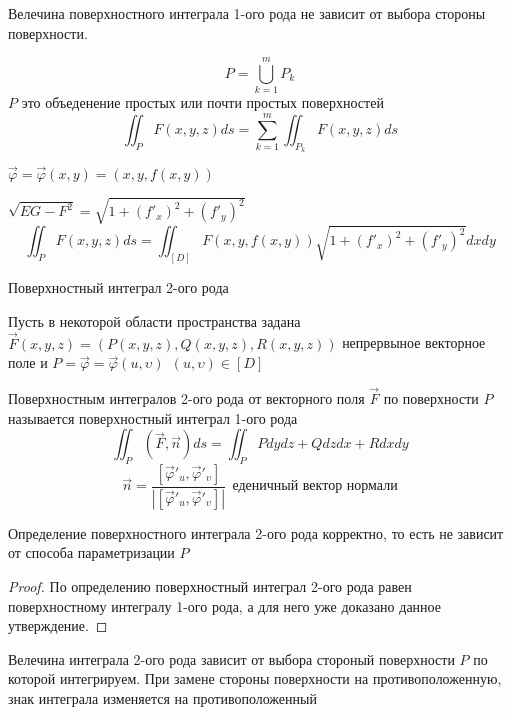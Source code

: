 \begin{theorem}
  Велечина поверхностного интеграла 1-ого рода не зависит от выбора стороны
  поверхности.
\end{theorem}

\begin{theorem}
  $$
  P = \bigcup_{k=1}^m P_k
  $$
  $P$ это объеденение простых или почти простых поверхностей
  $$
  \iint_P F(x,y,z) ds = \sum_{k=1}^m \iint_{P_k} F(x,y,z) ds
  $$
\end{theorem}

\begin{theorem}
  $\vec \varphi = \vec \varphi(x, y) = (x, y, f(x,y))$

  $\sqrt{EG-F^2} = \sqrt{1 + (f'_x)^2 + (f'_y)^2}$
  $$
  \iint_P F(x,y,z)ds = \iint_{[D]} F(x,y,f(x,y)) \sqrt{1 + (f'_x)^2 + (f'_y)^2}
  dx dy
  $$
\end{theorem}

\begin{title}[\Large]
  Поверхностный интеграл 2-ого рода
\end{title}

\begin{define}
  Пусть в некоторой области пространства задана
  $\vec F(x,y,z) = (P(x,y,z), Q(x,y,z),R(x,y,z))$ непрервыное векторное поле и
  $P = \vec \varphi = \vec \varphi(u, \upsilon) ~~ (u, \upsilon) \in [D]$

  Поверхностным интегралов 2-ого рода от векторного поля $\vec F$ по поверхности
  $P$ называется поверхностный интеграл 1-ого рода
  $$
  \iint_P (\vec F, \vec n) ds = \iint_P P dy dz + Q dz dx + Rdx dy
  $$
  $$
  \vec n = \frac{[\vec \varphi'_u, \vec \varphi'_{\upsilon}]}
  {|[\vec \varphi'_u, \vec \varphi'_{\upsilon}]|} ~~
  \text{еденичный вектор нормали}
  $$
\end{define}

\begin{theorem}
  Определение поверхностного интеграла 2-ого рода корректно, то есть не зависит
  от способа параметризации $P$
\end{theorem}

\begin{proof}
  По определению поверхностный интеграл 2-ого рода равен поверхностному
  интегралу 1-ого рода, а для него уже доказано данное утверждение.
\end{proof}

\begin{theorem}
  Велечина интеграла 2-ого рода зависит от выбора стороный поверхности $P$ по
  которой интегрируем. При замене стороны поверхности на противоположенную,
  знак интеграла изменяется на противоположенный
\end{theorem}


